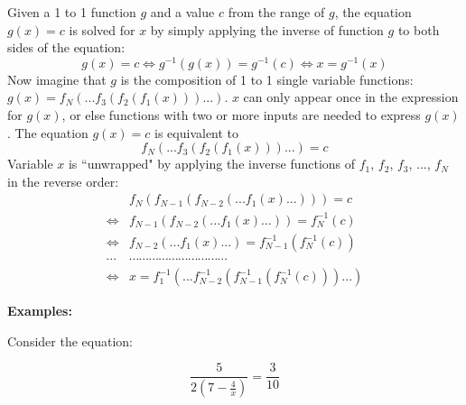 \documentclass{article}
\begin{document}
Given a 1 to 1 function \(g\) and a value \(c\) from the range of \(g\), the equation \(g(x) = c\) is solved for \(x\) by simply applying the inverse of function \(g\) to both sides of the equation:
\[g(x) = c \iff g^{-1}(g(x)) = g^{-1}(c) \iff x = g^{-1}(x)\]
Now imagine that \(g\) is the composition of 1 to 1 single variable functions: \(g(x) = f_N(...f_3(f_2(f_1(x)))...)\). \(x\) can only appear once in the expression for \(g(x)\), or else functions with two or more inputs are needed to express \(g(x)\). The equation \(g(x) = c\) is equivalent to 
\[f_N(...f_3(f_2(f_1(x)))...) = c\] 
Variable \(x\) is ``unwrapped" by applying the inverse functions of \(f_1\), \(f_2\), \(f_3\), ..., \(f_N\) in the reverse order:
\begin{align*}
& f_N(f_{N-1}(f_{N-2}(...f_1(x)...))) = c \\
\iff & f_{N-1}(f_{N-2}(...f_1(x)...)) = f_N^{-1}(c) \\  
\iff & f_{N-2}(...f_1(x)...) = f_{N-1}^{-1}(f_N^{-1}(c)) \\
\cdots & \cdots\cdots\cdots\cdots\cdots\cdots\cdots\cdots\cdots\cdots \\
\iff & x = f_1^{-1}(...f_{N-2}^{-1}(f_{N-1}^{-1}(f_N^{-1}(c)))...)
\end{align*}

\textbf{Examples:}

Consider the equation:

\[\frac{5}{2(7 - \frac{4}{x})} = \frac{3}{10}\]
\end{document}
